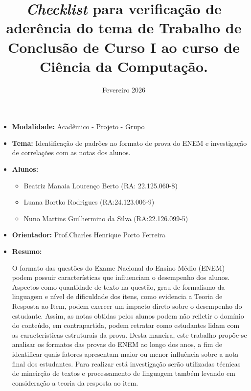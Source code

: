 \documentclass[11pt,a4,oneside]{article}
\title{\textit{Checklist} para verificação de aderência do tema de Trabalho de Conclusão de Curso I ao curso de Ciência da Computação.}
\date{Fevereiro 2026}
\begin{document}
\pagestyle{fancy}


\pagestyle{fancy}

\fancyhead{}


\maketitle

\begin{itemize}

\item \textbf{Modalidade:} Acadêmico - Projeto - Grupo

\item \textbf{Tema:} Identificação de padrões  no formato de prova do ENEM e investigação de correlações com as notas dos alunos.

\item \textbf{Alunos:}

\begin{itemize}

\item Beatriz Manaia Lourenço Berto (RA: 22.125.060-8)

\item Luana Bortko Rodrigues (RA:24.123.006-9)

\item Nuno Martins Guilhermino da Silva (RA:22.126.099-5)

\end{itemize}

\item \textbf{Orientador:} Prof.Charles Henrique Porto Ferreira

\item \textbf{Resumo:}

O formato das questões do Exame Nacional do Ensino Médio (ENEM) podem possuir características que influenciam o desempenho dos alunos. Aspectos como quantidade de texto na questão, grau de formalismo da linguagem e nível de dificuldade dos itens, como evidencia a Teoria de Resposta ao Item, podem exercer um impacto direto sobre o desempenho do estudante. Assim, as notas obtidas pelos alunos podem não refletir o domínio do conteúdo, em contrapartida, podem retratar como estudantes lidam com as características estruturais da prova. Desta maneira, este trabalho propõe-se analisar os formatos das provas do ENEM ao longo dos anos, a fim de identificar quais fatores apresentam maior ou menor influência sobre a nota final dos estudantes. Para realizar está investigação serão utilizadas técnicas de mineirção de textos e processamento de linguagem também levando em consideração a teoria da resposta ao item.


\end{itemize}
\end{document}
